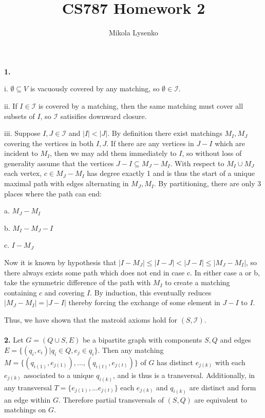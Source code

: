 \documentclass{article}
\title{CS787 Homework 2}
\author{Mikola Lysenko}
\begin{document}
\maketitle{}

\paragraph{} \textbf{1.}

i. $\emptyset \subseteq V$ is vacuously covered by any matching, so $\emptyset \in \mathcal{I}$.

ii. If $I \in \mathcal{I}$ is covered by a matching, then the same matching must cover all subsets of $I$, so $\mathcal{I}$ satisifies downward closure.

iii. Suppose $I, J \in \mathcal{I}$ and $|I| < |J|$.  By definition there exist matchings $M_I, M_J$ covering the vertices in both $I,J$.  If there are any vertices in $J - I$ which are incident to $M_I$, then we may add them immediately to $I$, so without loss of generality assume that the vertices $J-I \subseteq M_J-M_I$.  With respect to $M_I \cup M_J$ each vertex, $c \in M_J - M_I$ has degree exactly 1 and is thus the start of a unique maximal path with edges alternating in $M_J, M_I$.  By partitioning, there are only 3 places where the path can end:

a. $M_J - M_I$

b. $M_I - M_J - I$

c. $I - M_J$

Now it is known by hypothesis that $|I - M_J| \leq |I - J| < |J - I| \leq |M_J - M_I|$, so there always exists some path which does not end in case c.  In either case a or b, take the symmetric difference of the path with $M_I$ to create a matching containing $c$ and covering $I$.  By induction, this eventually reduces $|M_J - M_I| = |J - I|$ thereby forcing the exchange of some element in $J-I$ to $I$.

Thus, we have shown that the matroid axioms hold for $(S, \mathcal{I})$.

\paragraph{} \textbf{2.}
Let $G = ( Q \cup S, E )$ be a bipartite graph with components $S,Q$ and edges $E = \{ (q_i, e_i) | q_i \in Q, e_j \in q_i \} $.  Then any matching $M = \{ (q_{i(1)},e_{j(1)}), ..., (q_{i(t)},e_{j(t)}) \}$ of $G$ has distinct $e_{j(k)}$ with each $e_{j(k)}$ associated to a unique $q_{i(k)}$, and is thus is a transversal.  Additionally, in any transversal $T = \{ e_{j(1)}, ... e_{j(t)} \}$ each $e_{j(k)}$ and $q_{i(k)}$ are distinct and form an edge within $G$.  Therefore partial transversals of $(S,Q)$ are equivalent to matchings on $G$.
\end{document}
